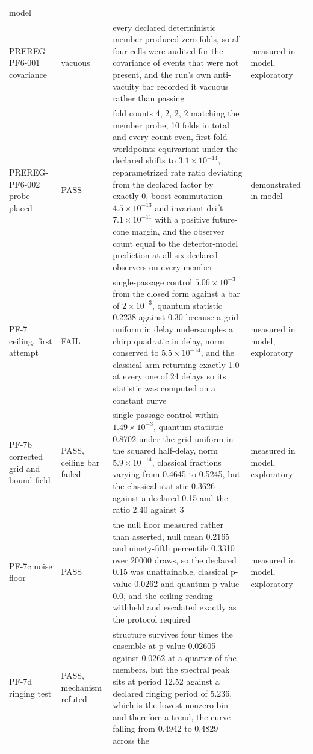 \documentclass[aps,pre,reprint,nofootinbib,floatfix]{revtex4-2}
\begin{document}
\begin{table}[p]
\begin{ruledtabular}
\begin{tabular}{L{2.5cm}L{1.9cm}L{9.0cm}L{2.7cm}}
model \\
PREREG-PF6-001 covariance & vacuous & every declared deterministic
member produced zero folds, so all four cells were audited for the
covariance of events that were not present, and the run's own
anti-vacuity bar recorded it vacuous rather than passing & measured in
model, exploratory \\
PREREG-PF6-002 probe-placed & PASS & fold counts 4, 2, 2, 2 matching
the member probe, 10 folds in total and every count even, first-fold
worldpoints equivariant under the declared shifts to
$3.1\times10^{-14}$, reparametrized rate ratio deviating from the
declared factor by exactly 0, boost commutation
$4.5\times10^{-13}$ and invariant drift $7.1\times10^{-11}$ with a
positive future-cone margin, and the observer count equal to the
detector-model prediction at all six declared observers on every member
& demonstrated in model \\
PF-7 ceiling, first attempt & FAIL & single-passage control
$5.06\times10^{-3}$ from the closed form against a bar of
$2\times10^{-3}$, quantum statistic 0.2238 against 0.30 because a grid
uniform in delay undersamples a chirp quadratic in delay, norm
conserved to $5.5\times10^{-14}$, and the classical arm returning
exactly 1.0 at every one of 24 delays so its statistic was computed on
a constant curve & measured in model, exploratory \\
PF-7b corrected grid and bound field & PASS, ceiling bar failed &
single-passage control within $1.49\times10^{-3}$, quantum statistic
0.8702 under the grid uniform in the squared half-delay, norm
$5.9\times10^{-14}$, classical fractions varying from 0.4645 to 0.5245,
but the classical statistic 0.3626 against a declared 0.15 and the
ratio 2.40 against 3 & measured in model, exploratory \\
PF-7c noise floor & PASS & the null floor measured rather than
asserted, null mean 0.2165 and ninety-fifth percentile 0.3310 over
20000 draws, so the declared 0.15 was unattainable, classical p-value
0.0262 and quantum p-value 0.0, and the ceiling reading withheld and
escalated exactly as the protocol required & measured in model,
exploratory \\
PF-7d ringing test & PASS, mechanism refuted & structure survives four
times the ensemble at p-value 0.02605 against 0.0262 at a quarter of
the members, but the spectral peak sits at period 12.52 against a
declared ringing period of 5.236, which is the lowest nonzero bin and
therefore a trend, the curve falling from 0.4942 to 0.4829 across the

\end{tabular}
\end{ruledtabular}
\end{table}
\end{document}
